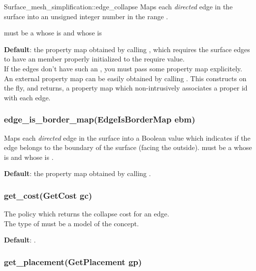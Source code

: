 \begin{ccRefFunction}{Surface_mesh_simplification::edge_collapse}
Maps each {\em directed} edge in the surface into an unsigned integer number
in the range \ccc{[0,num_edges(surface))}.

 must be a
whose  is
and whose  is 

\textbf{Default}: the property map obtained by calling ,
which requires the surface edges to have an  member properly initialized to the 
require value.\\
If the edges don't have such an , you must pass some property map explicitely.
An external property map can be easily obtained by calling 
. This constructs on the fly, and returns,
a property map which non-intrusively associates a proper id with each edge.

\subsubsection*{edge\_is\_border\_map(EdgeIsBorderMap ebm)} 

Maps each {\em directed} edge in the surface into a Boolean value
which indicates if the edge belongs to the boundary of the surface
(facing the outside).
 must be a 
whose  is
and whose  is .

\textbf{Default}: the property map obtained by calling .

\subsubsection*{get\_cost(GetCost gc)}

The policy which returns the collapse cost for an edge.\\
The type of  must be a model of the  concept.

\textbf{Default}: 
.

\subsubsection*{get\_placement(GetPlacement gp)}


\end{ccRefFunction}
